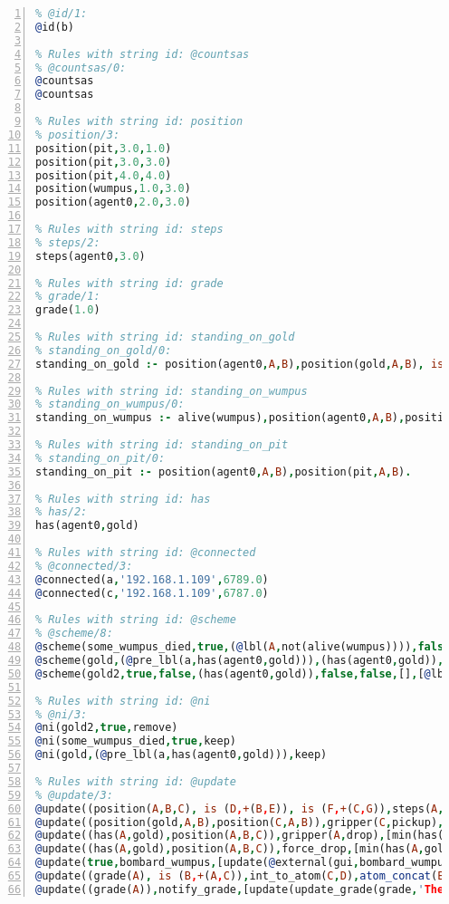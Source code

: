 \documentclass[11pt]{article}\usepackage[utf8]{inputenc}\usepackage{geometry}
\begin{document}
\lstset{breaklines=true}\begin{lstlisting}[language=Prolog, numbers=left]
% Rules with string id: @id
% @id/1:
@id(b)

% Rules with string id: @countsas
% @countsas/0:
@countsas
@countsas

% Rules with string id: position
% position/3:
position(pit,3.0,1.0)
position(pit,3.0,3.0)
position(pit,4.0,4.0)
position(wumpus,1.0,3.0)
position(agent0,2.0,3.0)

% Rules with string id: steps
% steps/2:
steps(agent0,3.0)

% Rules with string id: grade
% grade/1:
grade(1.0)

% Rules with string id: standing_on_gold
% standing_on_gold/0:
standing_on_gold :- position(agent0,A,B),position(gold,A,B), is (C,+(A,B)),>(C,2.0).

% Rules with string id: standing_on_wumpus
% standing_on_wumpus/0:
standing_on_wumpus :- alive(wumpus),position(agent0,A,B),position(wumpus,A,B).

% Rules with string id: standing_on_pit
% standing_on_pit/0:
standing_on_pit :- position(agent0,A,B),position(pit,A,B).

% Rules with string id: has
% has/2:
has(agent0,gold)

% Rules with string id: @connected
% @connected/3:
@connected(a,'192.168.1.109',6789.0)
@connected(c,'192.168.1.109',6787.0)

% Rules with string id: @scheme
% @scheme/8:
@scheme(some_wumpus_died,true,(@lbl(A,not(alive(wumpus)))),false,false,false,[update(bombard_wumpus)|[]],[])
@scheme(gold,(@pre_lbl(a,has(agent0,gold))),(has(agent0,gold)),false,(@lbl(a,not(has(agent0,gold)))),false,[update(force_drop)|[]],[])
@scheme(gold2,true,false,(has(agent0,gold)),false,false,[],[@lbl(c,update(bombard_wumpus))|[]])

% Rules with string id: @ni
% @ni/3:
@ni(gold2,true,remove)
@ni(some_wumpus_died,true,keep)
@ni(gold,(@pre_lbl(a,has(agent0,gold))),keep)

% Rules with string id: @update
% @update/3:
@update((position(A,B,C), is (D,+(B,E)), is (F,+(C,G)),steps(A,H), is (I,+(H,1.0))),move(A,E,G),[min(position(A,B,C)),plus(position(A,D,F)),min(steps(A,H)),plus(steps(A,I))|[]])
@update((position(gold,A,B),position(C,A,B)),gripper(C,pickup),[plus(has(C,gold)),min(position(gold,A,B))|[]])
@update((has(A,gold),position(A,B,C)),gripper(A,drop),[min(has(A,gold)),plus(position(gold,B,C))|[]])
@update((has(A,gold),position(A,B,C)),force_drop,[min(has(A,gold)),plus(position(gold,B,C)),update(@external(gui,gripper,D))|[]])
@update(true,bombard_wumpus,[update(@external(gui,bombard_wumpus,A)),min(alive(wumpus))|[]])
@update((grade(A), is (B,+(A,C)),int_to_atom(C,D),atom_concat(E,D,F)),update_grade(G,E,C),[min(grade(A)),plus(grade(B)),update(@external(gui,show_notice(G,F),H))|[]])
@update((grade(A)),notify_grade,[update(update_grade(grade,'The end result: ',A))|[]])

\end{lstlisting}
\end{document}

